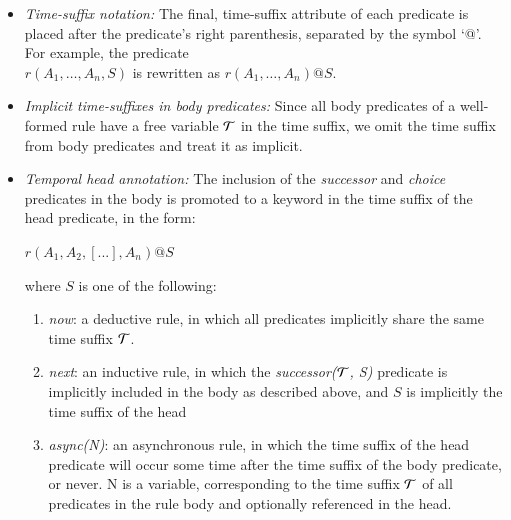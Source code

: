 \begin{itemize}
	\item {\em Time-suffix notation:}  The final, time-suffix attribute of each predicate is placed after the predicate's right parenthesis, separated by the symbol `@'.   For example, the predicate \\
	$r(A_{1}, \ldots, A_{n}, S)$ is rewritten as $r(A_{1}, \ldots, A_{n})@S$.
	\item {\em Implicit time-suffixes in body predicates:} Since all body predicates of a well-formed rule have a free variable $\mathcal{T}$ in the time suffix, we omit the time suffix from body predicates and treat it as implicit. 
	\item {\em Temporal head annotation:} The inclusion of the \emph{successor}
and \emph{choice} predicates in the body is promoted to a keyword in the time suffix of the head predicate, in the form:

$r(A_{1},A_{2},[...],A_{n})@S$

where $S$ is one of the following:
\begin{enumerate}
\item \emph{now}: a deductive rule, in which all predicates implicitly share the same time suffix $\mathcal{T}$.
\item \emph{next}: an inductive rule, in which the \emph{successor($\mathcal{T}$, S)} predicate is implicitly included in the body as described above, and $S$ is implicitly the time suffix of the head
\item \emph{async(N)}: an asynchronous rule, in which the time suffix of the head predicate will occur some time after the time suffix of the body predicate, or never.
N is a variable, corresponding to the time suffix $\mathcal{T}$ of all predicates in the rule body and optionally referenced in the head.
\end{enumerate}
\end{itemize}

% 
% 


